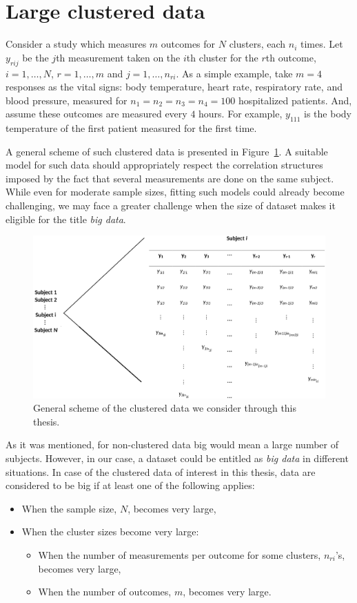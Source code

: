 \documentclass[11pt,a5paper,twoside]{book}
\begin{document}
\section{Large clustered data}

Consider a study which measures $m$ outcomes for $N$ clusters, each $n_i$ times. Let $y_{rij}$ be the $j$th measurement taken on the $i$th cluster for the $r$th outcome, $i=1,\ldots,N$, $r=1,\ldots,m$ and $j=1,\ldots,n_{ri}$. As a simple example, take $m=4$ responses as the vital signs: body temperature, heart rate, respiratory rate, and blood pressure, measured for $n_1 = n_2 = n_3 = n_4 = 100$ hospitalized patients. And, assume these outcomes are measured every $4$ hours. For example, $y_{111}$ is the body temperature of the first patient measured for the first time. 

A general scheme of such clustered data is presented in Figure~\ref{fig_scheme}. A suitable model for such data should appropriately respect the correlation structures imposed by the fact that several measurements are done on the same subject. While even for moderate sample sizes, fitting such models could already become challenging, we may face a greater challenge when the size of dataset makes it eligible for the title \emph{big data}. 

\begin{figure}
\centering
\includegraphics[width=\textwidth]{scheme_new.eps}
\caption{General scheme of the clustered data we consider through this thesis.} 
\label{fig_scheme}
\end{figure} 


As it was mentioned, for non-clustered data big would mean a large number of subjects. However, in our case, a dataset could be entitled as \emph{big data} in different situations. In case of the clustered data of interest in this thesis, data are considered to be big if at least one of the following applies:
\begin{itemize}
\item When the sample size, $N$, becomes very large,
\item When the cluster sizes become very large:
\begin{itemize}
\item When the number of measurements per outcome for some clusters, $n_{ri}$'s, becomes very large,
\item When the number of outcomes, $m$, becomes very large.
\end{itemize}
\end{itemize}
\end{document}

